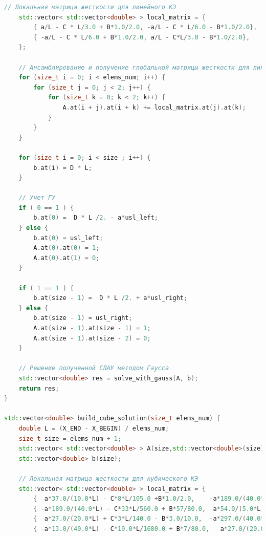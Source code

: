 \begin{lstlisting}[language=c++, label=prog,caption={\textit{Реализация МКЭ}}]
    // Локальная матрица жесткости для линейного КЭ
    std::vector< std::vector<double> > local_matrix = {
        { a/L - C * L/3.0 + B*1.0/2.0, -a/L - C * L/6.0 - B*1.0/2.0},
        { -a/L - C * L/6.0 + B*1.0/2.0, a/L - C*L/3.0 - B*1.0/2.0},
    };

    // Ансамблирование и получение глобальной матрицы жесткости для линейного КЭ
    for (size_t i = 0; i < elems_num; i++) {
        for (size_t j = 0; j < 2; j++) {
            for (size_t k = 0; k < 2; k++) {
                A.at(i + j).at(i + k) += local_matrix.at(j).at(k);
            }
        }
    }

    for (size_t i = 0; i < size ; i++) {
        b.at(i) = D * L;
    }

    // Учет ГУ
    if ( 0 == 1 ) {
        b.at(0) =  D * L /2. - a*usl_left;
    } else {
        b.at(0) = usl_left;
        A.at(0).at(0) = 1;
        A.at(0).at(1) = 0;
    }

    if ( 1 == 1 ) {
        b.at(size - 1) =  D * L /2. + a*usl_right;
    } else {
        b.at(size - 1) = usl_right;
        A.at(size - 1).at(size - 1) = 1;
        A.at(size - 1).at(size - 2) = 0;
    }

    // Решение полученной СЛАУ методом Гаусса
    std::vector<double> res = solve_with_gauss(A, b);
    return res;
}

std::vector<double> build_cube_solution(size_t elems_num) {
    double L = (X_END - X_BEGIN) / elems_num;
    size_t size = elems_num + 1;
    std::vector< std::vector<double> > A(size,std::vector<double>(size));
    std::vector<double> b(size);
    
    // Локальная матрица жесткости для кубического КЭ
    std::vector< std::vector<double> > local_matrix = {
        {  a*37.0/(10.0*L) - C*8*L/105.0 +B*1.0/2.0,    -a*189.0/(40.0*L) - C*33*L/560.0 - B*57/80.0, a*27.0/(20.0*L) + C*3*L/140.0 + B*3.0/10.0, -a*13.0/(40.0*L) -  C*19.0*L/1680.0 - B*7/80.0},
        { -a*189.0/(40.0*L) - C*33*L/560.0 + B*57/80.0,  a*54.0/(5.0*L)-C*27*L/70.0,                  -a*297.0/(40*L) + C*27*L/560.0 - B*81.0/80.0,    a*27.0/(20.0*L) +  C*3*L/140.0 + B*3.0/10.0},
        {  a*27.0/(20.0*L) + C*3*L/140.0 - B*3.0/10.0,  -a*297.0/(40.0*L) + C*27*L/560.0 + B*81.0/80.0,  a*54.0/(5.0*L) - C*27*L/70.0,                -a*189.0/(40.0*L) - C*33*L/560.0 - B*57/80.0},
        { -a*13.0/(40.0*L) - C*19.0*L/1680.0 + B*7/80.0,   a*27.0/(20.0*L) + C*3*L/140.0 - B*3.0/10.0 , -a*189.0/(40.0*L) - C*33*L/560.0 + B*57/80.0,      a*37.0/(10.0*L) - C*8*L/105.0 - B*1.0/2.0}


\end{lstlisting}
